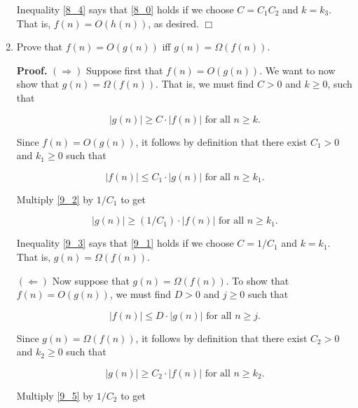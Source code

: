 \documentclass[9pt]{article}
\newcommand{\qed}{\hfill \ensuremath{\Box}}
\begin{document}
\begin{enumerate}
      Inequality \eqref{8_4} says that \eqref{8_0} holds if we choose
      $C = C_1C_2$ and $k = k_3$. That is, ${f(n) = O(h(n))}$, as desired. \qed
   \item Prove that $f(n) = O(g(n))$ iff $g(n) = \Omega(f(n))$.

      \textbf{Proof.} $(\Rightarrow)$ Suppose first that $f(n) = O(g(n))$. We
      want to now show that ${g(n) = \Omega(f(n))}$. That is, we must find
      $C > 0$ and $k \ge 0$, such that

      \begin{equation} \label{9_1}
         |g(n)| \ge C \cdot |f(n)| \text{ for all } n \ge k.
      \end{equation}

      Since $f(n) = O(g(n))$, it follows by definition that there exist
      $C_1 > 0$ and $k_1 \ge 0$ such that 

      \begin{equation} \label{9_2}
         |f(n)| \le C_1 \cdot |g(n)| \text{ for all } n \ge k_1.
      \end{equation}

      Multiply \eqref{9_2} by $1/C_1$ to get

      \begin{equation} \label{9_3}
         |g(n)| \ge (1/C_1) \cdot |f(n)| \text{ for all } n \ge k_1.
      \end{equation}

      Inequality \eqref{9_3} says that \eqref{9_1} holds if we choose
      $C = 1/C_1$ and $k = k_1$. That is, $g(n) = \Omega(f(n))$.

      $(\Leftarrow)$ Now suppose that $g(n) = \Omega(f(n))$. To show that
      $f(n) = O(g(n))$, we must find $D > 0$ and $j \ge 0$ such that

      \begin{equation} \label{9_4}
         |f(n)| \le D \cdot |g(n)| \text{ for all } n \ge j.
      \end{equation}

      Since $g(n) = \Omega(f(n))$, it follows by definition that there exist
      $C_2 > 0$ and $k_2 \ge 0$ such that 

      \begin{equation} \label{9_5}
         |g(n)| \ge C_2 \cdot |f(n)| \text{ for all } n \ge k_2.
      \end{equation}

      Multiply \eqref{9_5} by $1/C_2$ to get


\end{enumerate}
\end{document}
